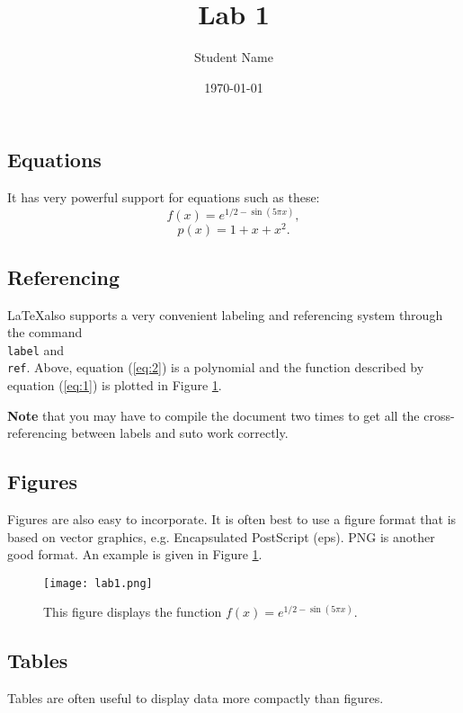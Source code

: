 \documentclass[12pt]{article}
\title{ Lab 1 }
\author{Student Name }
\date{\today}   %
\begin{document}
\maketitle
\clearpage

\subsection{Equations}
It has very powerful support for equations such
as these:
\begin{equation}
f(x) = e^{1/2 - \sin(5 \pi    x)}, \label{eq:1} 
\end{equation}
\begin{equation}
p(x) = 1+x+x^2. \label{eq:2} 
\end{equation}

\subsection{Referencing}
\LaTeX also supports a very convenient labeling and referencing system
through the command \texttt{\\label} and \texttt{\\ref}.  Above, equation
(\ref{eq:2}) is a polynomial and the function described by equation
(\ref{eq:1}) is plotted in Figure \ref{fig:1}. 

{\bf Note} that you may have to compile the document two times to get
all the cross-referencing between labels and suto work correctly.

\subsection{Figures}
Figures are also easy to incorporate. It is often best to use a figure
format that is based on vector graphics, e.g. Encapsulated PostScript
(eps). PNG is another good format.  An example is given in Figure \ref{fig:1}. 

\begin{figure}[htb]
\begin{center}
   \texttt{[image: lab1.png]}
   \caption{This figure displays the function $f(x) = e^{1/2 - \sin(5 \pi x)}$.} 
   \label{fig:1}
\end{center}
\end{figure}

\subsection{Tables}
Tables are often useful to display data more compactly than figures.
\end{document}
